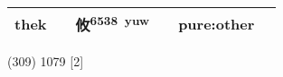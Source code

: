 \documentclass[14pt,a4paper]{scrartcl}
\begin{document}
\begin{longtable}[c]{@{}llllll@{}}
\begin{minipage}[t]{0.14\columnwidth}
thek
\strut\end{minipage} &
\begin{minipage}[t]{0.14\columnwidth}\raggedright\strut
\strut\end{minipage} &
\begin{minipage}[t]{0.14\columnwidth}\raggedright\strut
攸\textsuperscript{6538~yuw}
\strut\end{minipage} &
\begin{minipage}[t]{0.14\columnwidth}\raggedright\strut
\strut\end{minipage} &
\begin{minipage}[t]{0.14\columnwidth}\raggedright\strut
pure:other
\strut\end{minipage}\tabularnewline
\bottomrule
\end{longtable}

(309) 1079 {[}2{]}
\end{document}
